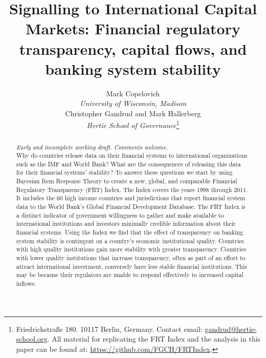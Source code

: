 \documentclass[a4paper]{article}
\title{Signalling to International Capital Markets: Financial regulatory transparency, capital flows, and banking system stability
}
\author{Mark Copelovich \\ \emph{University of Wisconsin, Madison} \\[0.5cm] Christopher Gandrud and Mark Hallerberg \\
    {\emph{Hertie School of Governance}}\footnote{Friedrichstra{\ss}e 180. 10117 Berlin, Germany. Contact email: \href{mailto:gandrud@hertie-school.org}{gandrud@hertie-school.org}. All material for replicating the FRT Index and the analysis in this paper can be found at: \url{https://github.com/FGCH/FRTIndex}.}}
\begin{document}
\maketitle

\begin{abstract}
\noindent \emph{Early and incomplete working draft. Comments welcome.} \\
    Why do countries release data on their financial systems to international organizations such as the IMF and World Bank? What are the consequences of releasing this data for their financial systems' stability? To answer these questions we start by using Bayesian Item Response Theory to create a new, global, and comparable Financial Regulatory Transparency (FRT) Index. The Index covers the years 1998 through 2011. It includes the 60 high income countries and jurisdictions that report financial system data to the World Bank’s Global Financial Development Database. The FRT Index is a distinct indicator of government willingness to gather and make available to international institutions and investors minimally credible information about their financial systems. Using the Index we find that the effect of transparency on banking system stability is contingent on a country’s economic institutional quality. Countries with high quality institutions gain more stability with greater transparency. Countries with lower quality institutions that increase transparency, often as part of an effort to attract international investment, conversely have less stable financial institutions. This may be because their regulators are unable to respond effectively to increased capital inflows.

\end{abstract}
\end{document}
